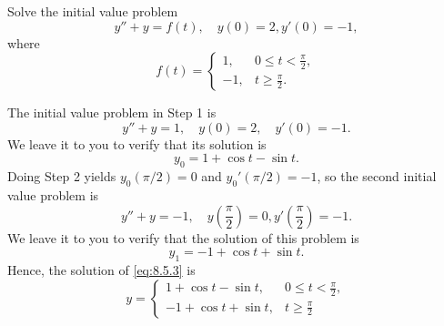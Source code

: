 \documentclass{ximera}
\begin{document}
\begin{example}\label{example:8.5.1}
Solve the initial value problem
\begin{equation}\label{eq:8.5.3}
y''+y=f(t),
\quad   y(0)=2,  y'(0)=-1,
\end{equation}
where
$$
f(t)=\left\{\begin{array}{rl}
1,&0\leq t<\frac{\pi}{2},\\
-1,&t\geq \frac{\pi}{2}.
\end{array}\right.
$$
\begin{explanation}
The initial value problem in Step 1 is
$$
y''+y=1, \quad   y(0)=2,\quad y'(0)=-1.
$$
We leave it to you to verify that its solution is
$$
y_0=1+\cos t-\sin t.
$$
Doing Step 2 yields
 $y_0(\pi/2)=0$ and $y_0'(\pi/2)=-1$,
so the second initial value problem is
$$
y''+y=-1, \quad  y\left(\frac{\pi}{2}\right)=0, y'\left(\frac{\pi}{2}\right)=-1.
$$
We leave it to you to verify that the solution of this problem
is
$$
y_1=-1+\cos t+\sin t.
$$
Hence, the solution of \eqref{eq:8.5.3} is
\begin{equation}\label{eq:8.5.4}
y=\left\{\begin{array}{rl}
1+\cos t-\sin t,&0\leq t<\frac{\pi}{2},
\\
-1+\cos t+\sin t,&t\geq \frac{\pi}{2}
\end{array}\right.
\end{equation}

\begin{center}
\end{center}


\end{explanation}
\end{example}
\end{document}
